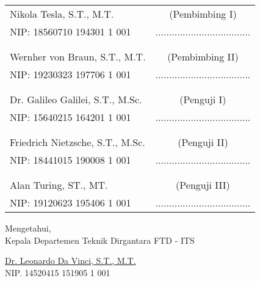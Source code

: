     \noindent
    \begin{tabularx}{\textwidth}{X c}
      Nikola Tesla, S.T., M.T.          & (Pembimbing I) \\
      NIP: 18560710 194301 1 001        & ................................... \\
      &  \\
      &  \\
      Wernher von Braun, S.T., M.T.     & (Pembimbing II) \\
      NIP: 19230323 197706 1 001        & ................................... \\
      &  \\
      &  \\
      Dr. Galileo Galilei, S.T., M.Sc.  & (Penguji I) \\
      NIP: 15640215 164201 1 001        & ................................... \\
      &  \\
      &  \\
      Friedrich Nietzsche, S.T., M.Sc.  & (Penguji II) \\
      NIP: 18441015 190008 1 001        & ................................... \\
      &  \\
      &  \\
      Alan Turing, ST., MT.             & (Penguji III) \\
      NIP: 19120623 195406 1 001        & ................................... \\
    \end{tabularx}
  \endgroup

  \vspace{2ex}

  \begin{center}
    Mengetahui, \\
    Kepala Departemen Teknik Dirgantara FTD - ITS \\

    \vspace{8ex}

    \underline{Dr. Leonardo Da Vinci, S.T., M.T.} \\
    NIP. 14520415 151905 1 001
  \end{center}
\endgroup
